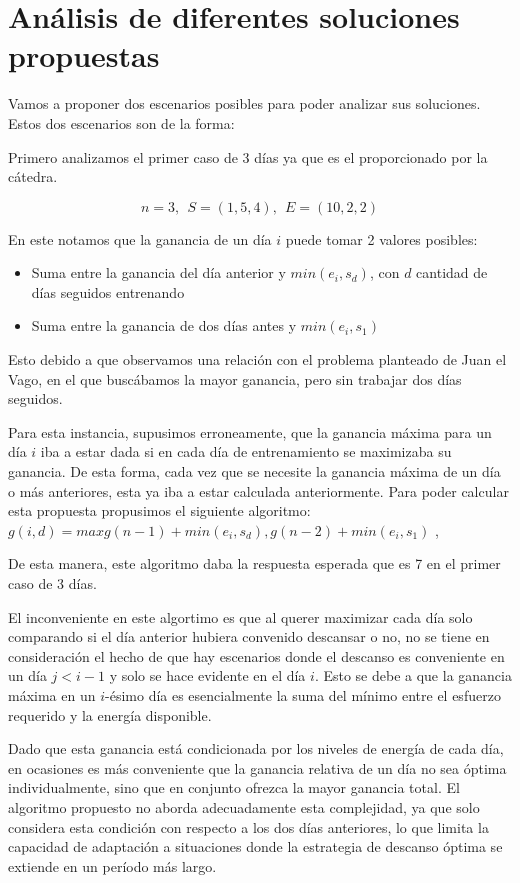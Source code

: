 \section{Análisis de diferentes soluciones propuestas}
Vamos a proponer dos escenarios posibles para poder analizar sus soluciones. Estos dos escenarios son de la forma: 


Primero analizamos el primer caso de 3 días ya que es el proporcionado por la cátedra.

$$
n = 3,\ \ S=(1, 5, 4),\ \ E=(10,2,2)
$$

En este
notamos que la ganancia de un día $i$ puede tomar 2 valores posibles: 
\begin{itemize}
    \item Suma entre la ganancia del día anterior y $min(e_i, s_d)$, con $d$ cantidad de días seguidos entrenando
    \item Suma entre la ganancia de dos días antes y $min(e_i, s_1)$
\end{itemize}

Esto debido a que observamos una relación con el problema planteado de Juan el Vago, en el que buscábamos la mayor ganancia,
pero sin trabajar dos días seguidos.

Para esta instancia, supusimos erroneamente, que la ganancia máxima para un día $i$ iba a estar dada si en cada día de entrenamiento 
se maximizaba su ganancia. De esta forma, cada vez que se necesite la ganancia máxima de un día o más anteriores, esta ya iba a estar calculada
anteriormente. Para poder calcular esta propuesta propusimos el siguiente algoritmo:
$g(i, d)= max{g(n-1) + min(e_i,s_d), g(n-2) + min(e_i,s_1)}$ , 

De esta manera, este algoritmo daba la respuesta esperada que es 7 en el primer caso de 3 días.

El inconveniente en este algortimo es que al querer maximizar cada día solo comparando si el día anterior hubiera convenido
descansar o no, no se tiene en consideración el hecho de que hay escenarios donde el descanso es conveniente en un día
$j < i-1$ y solo se hace evidente en el día $i$. 
Esto se debe a que la ganancia máxima en un $i$-ésimo día es esencialmente la suma del mínimo entre el esfuerzo requerido y la 
energía disponible.

Dado que esta ganancia está condicionada por los niveles de energía de cada día, en ocasiones es más 
conveniente que la ganancia relativa de un día no sea óptima individualmente, sino que en conjunto 
ofrezca la mayor ganancia total. El algoritmo propuesto no aborda adecuadamente esta complejidad, 
ya que solo considera esta condición con respecto a los dos días anteriores, lo que limita la 
capacidad de adaptación a situaciones donde la estrategia de descanso óptima se extiende en un 
período más largo.

